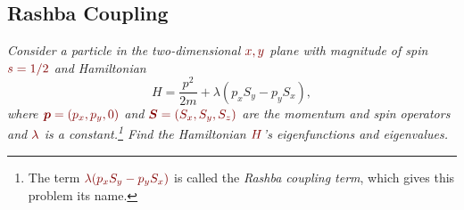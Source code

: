 \documentclass[11pt, a4paper]{article}
\newcommand{\dmath}[1]{\textcolor{Maroon}{#1}}  %
\renewcommand{\vec}[1]{\bm{#1}} %
\begin{document}
\subsection{Rashba Coupling}
\textit{Consider a particle in the two-dimensional $ \dmath{x, y} $ plane with magnitude of spin $ \dmath{s = 1/2} $ and Hamiltonian}
\begin{equation*}
	H = \frac{p^{2}}{2m} + \lambda (p_{x}S_{y} - p_{y}S_{x}),
\end{equation*}
\textit{where $ \dmath{\vec{p} = (p_{x}, p_{y}, 0)} $ and $ \dmath{\vec{S} = (S_{x}, S_{y}, S_{z})} $ are the momentum and spin operators and $ \dmath{\lambda} $ is a constant.\footnote{The term $ \dmath{\lambda (p_{x}S_{y} - p_{y}S_{x})} $ is called the \textit{Rashba coupling term}, which gives this problem its name.} Find the Hamiltonian $ \dmath{H} $'s eigenfunctions and eigenvalues.}
\end{document}
